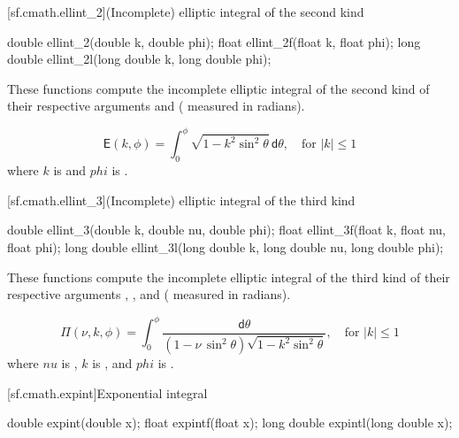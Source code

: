 [sf.cmath.ellint_2]{(Incomplete) elliptic integral of the second kind}%
%
%
%
%
%
\begin{itemdecl}
double       ellint_2(double k, double phi);
float        ellint_2f(float k, float phi);
long double  ellint_2l(long double k, long double phi);
\end{itemdecl}

\begin{itemdescr}

\pnum\effects
These functions compute
the incomplete elliptic integral of the second kind
of their respective arguments
 and  ( measured in radians).

\pnum\returns
\[%
  \mathsf{E}(k, \phi) =
  \int_0^\phi \! \sqrt{1 - k^2 \sin^2 \theta} \, \mathsf{d}\theta,
	   \quad \mbox{for $|k| \le 1$}
\]
where
$k$ is  and
$phi$ is .
\end{itemdescr}

[sf.cmath.ellint_3]{(Incomplete) elliptic integral of the third kind}%
%
%
%
%
%
\begin{itemdecl}
double       ellint_3(double k, double nu, double phi);
float        ellint_3f(float k, float nu, float phi);
long double  ellint_3l(long double k, long double nu, long double phi);
\end{itemdecl}

\begin{itemdescr}

\pnum\effects
These functions compute
the incomplete elliptic integral of the third kind
of their respective arguments
, , and  ( measured in radians).

\pnum\returns
\[%
  \mathsf{\Pi}(\nu, k, \phi) =
  \int_0^\phi \! \frac{ \mathsf{d}\theta }
                      { (1 - \nu \, \sin^2 \theta) \sqrt{1 - k^2 \sin^2 \theta} },
	   \quad \mbox{for $|k| \le 1$}
\]
where
$nu$ is ,
$k$ is , and
$phi$ is .
\end{itemdescr}

[sf.cmath.expint]{Exponential integral}%
%
%
%
%
%
\begin{itemdecl}
double       expint(double x);
float        expintf(float x);
long double  expintl(long double x);
\end{itemdecl}

